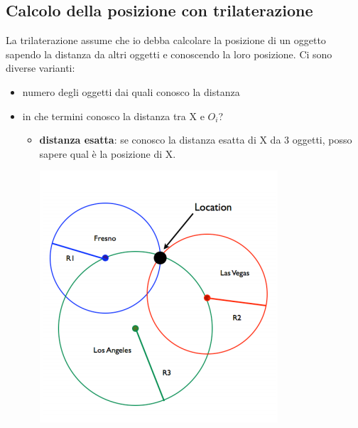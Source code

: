 \subsection{Calcolo della posizione con trilaterazione}
La trilaterazione assume che io debba calcolare la posizione di un oggetto sapendo la distanza da altri oggetti e conoscendo la loro posizione. 
Ci sono diverse varianti: 
\begin{itemize}
    \item numero degli oggetti dai quali conosco la distanza
    \item in che termini conosco la distanza tra X e $O_i$?
    \begin{itemize}
        \item \textbf{distanza esatta}: se conosco la distanza esatta di X da 3 oggetti, posso sapere qual è la posizione di X. 
        \begin{center}
            \includegraphics[width=.25\textwidth]{images/Mobile computing/4. Posizione/distanza esatta.PNG}
        \end{center}
        

\end{itemize}
\end{itemize}
